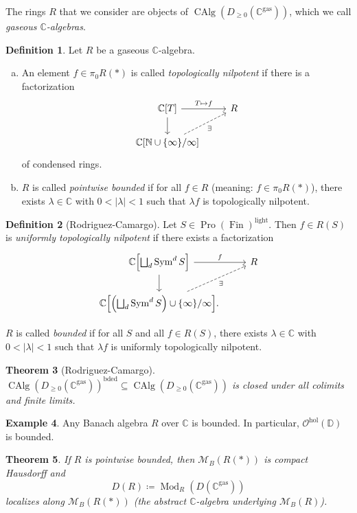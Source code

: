 \documentclass[draft]{amsart}
\newcommand{\NN}{\mathbb{N}}
\newcommand{\DD}{\mathbb{D}}
\newcommand{\CC}{\mathbb{C}}
\renewcommand{\O}{\mathcal{O}}
\newcommand{\cat}[1]{\mathcal{#1}}
\DeclareMathOperator{\CAlg}{CAlg}
\DeclareMathOperator{\Sym}{Sym}
\DeclareMathOperator{\Mod}{Mod}
\DeclareMathOperator{\Pro}{Pro}
\DeclareMathOperator{\Fin}{Fin}
\newtheorem{thm}{Theorem}[section]
\theoremstyle{definition}
\newtheorem{defn}[thm]{Definition}
\newtheorem{ex}[thm]{Example}
\begin{document}
The rings $R$ that we consider are objects of $\CAlg(D_{\ge0}(\CC^{\mathrm{gas}}))$, which we call \emph{gaseous $\CC$-algebras}.

\begin{defn}
Let $R$ be a gaseous $\CC$-algebra.
\begin{enumerate}[(a)]
\item An element $f\in \pi_0R(*)$ is called \emph{topologically nilpotent} if there is a factorization
\[
\begin{tikzcd}
\CC[T] \ar[d] \ar[r,"T\mapsto f"] & R \\
\CC[\NN\cup\{\infty\}/\infty] \ar[ur,dashed,"\exists"']
\end{tikzcd}
\]
of condensed rings.

\item $R$ is called \emph{pointwise bounded} if for all $f\in R$ (meaning: $f\in \pi_0R(*)$), there exists $\lambda\in \CC$ with $0<\lvert \lambda\rvert <1$ such that $\lambda f$ is topologically nilpotent.
\end{enumerate}
\end{defn}

\begin{defn}[Rodriguez-Camargo]
Let $S\in \Pro(\Fin)^{\mathrm{light}}$. Then $f\in R(S)$ is \emph{uniformly topologically nilpotent} if there exists a factorization
\[
\begin{tikzcd}
\CC\Bigl[\bigsqcup_d \Sym^dS\Bigr] \ar[d] \ar[r,"f"] & R \\
\CC\Bigl[\Bigl(\bigsqcup_d \Sym^dS\Bigr)\cup\{\infty\}/\infty\Bigr] \ar[ur,dashed, "\exists"'].
\end{tikzcd}
\]

$R$ is called \emph{bounded} if for all $S$ and all $f\in R(S)$, there exists $\lambda\in \CC$ with $0 <\lvert \lambda\rvert < 1$ such that $\lambda f$ is uniformly topologically nilpotent.
\end{defn}

\begin{thm}[Rodriguez-Camargo]
$\CAlg(D_{\ge0}(\CC^{\mathrm{gas}}))^{\mathrm{bded}} \subseteq \CAlg(D_{\ge0}(\CC^{\mathrm{gas}}))$ is closed under all colimits and finite limits.
\end{thm}

\begin{ex}
Any Banach algebra $R$ over $\CC$ is bounded. In particular, $\O^{\mathrm{hol}}(\DD)$ is bounded.
\end{ex}

\begin{thm}
If $R$ is pointwise bounded, then $\cat M_B(R(*))$ is compact Hausdorff and
\[
D(R) \coloneqq \Mod_R(D(\CC^{\mathrm{gas}}))
\]
localizes along $\cat M_B(R(*))$ (the abstract $\CC$-algebra underlying $\cat M_B(R)$).
\end{thm}
\end{document}
